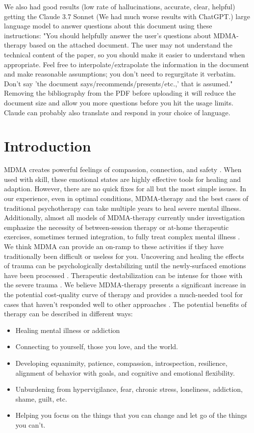 \documentclass[12pt,letterpaper]{book}
\begin{document}
We also had good results (low rate of hallucinations, accurate, clear, helpful) getting the Claude 3.7 Sonnet (We had much worse results with ChatGPT.) large language model to answer questions about this document using these instructions: "You should helpfully answer the user's questions about MDMA-therapy based on the attached document. The user may not understand the technical content of the paper, so you should make it easier to understand when appropriate. Feel free to interpolate/extrapolate the information in the document and make reasonable assumptions; you don't need to regurgitate it verbatim. Don't say 'the document says/recommends/presents/etc.,' that is assumed." Removing the bibliography from the PDF before uploading it will reduce the document size and allow you more questions before you hit the usage limits. Claude can probably also translate and respond in your choice of language.
\section{Introduction}
\label{sec:introduction}
MDMA creates powerful feelings of compassion, connection, and safety \cite{fedduciaMDMAMemoryReconsolidation}. When used with skill, these emotional states are highly effective tools for healing and adaption. However, there are no quick fixes for all but the most simple issues. In our experience, even in optimal conditions, MDMA-therapy and the best cases of traditional psychotherapy can take multiple years to heal severe mental illness. Additionally, almost all models of MDMA-therapy currently under investigation emphasize the necessity of between-session therapy or at-home therapeutic exercises, sometimes termed integration, to fully treat complex mental illness \cite{bathje2022Integration}. We think MDMA can provide an on-ramp to these activities if they have traditionally been difficult or useless for you. Uncovering and healing the effects of trauma can be psychologically destabilizing until the newly-surfaced emotions have been processed \cite{olthofDestabilization}. Therapeutic destabilization can be intense for those with the severe trauma \cite{studyingHarms}. We believe MDMA-therapy presents a significant increase in the potential cost-quality curve of therapy and provides a much-needed tool for cases that haven't responded well to other approaches \cite{mitchellMDMAClinicalTrial2}. The potential benefits of therapy can be described in different ways:
\begin{itemize}
    \item Healing mental illness or addiction
    \item Connecting to yourself, those you love, and the world.
    \item Developing equanimity, patience, compassion, introspection, resilience, alignment of behavior with goals, and cognitive and emotional flexibility.
    \item Unburdening from hypervigilance, fear, chronic stress, loneliness, addiction, shame, guilt, etc.
    \item Helping you focus on the things that you can change and let go of the things you can't.
\end{itemize}
\end{document}
